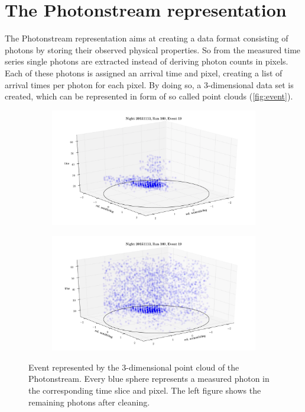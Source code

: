 \section{The Photonstream representation}

The Photonstream representation aims at creating a data format consisting of photons by storing their observed physical properties. So from the measured time series single photons are extracted instead of deriving photon counts in pixels. Each of these photons is assigned an arrival time and pixel, creating a list of arrival times per photon for each pixel. By doing so, a 3-dimensional data set is created, which can be represented in form of so called point clouds (\autoref{fig:event}).
%
\begin{figure}
  \begin{subfigure}{0.475\textwidth}
    \includegraphics[width=1.1\textwidth]{Plots/event1.png}
  \end{subfigure}
  \begin{subfigure}{0.475\textwidth}
    \includegraphics[width=1.1\textwidth]{Plots/event2.png}
  \end{subfigure}
  \caption{Event represented by the 3-dimensional point cloud of the Photonstream. Every blue sphere represents a measured photon in the corresponding time slice and pixel. The left figure shows the remaining photons after cleaning.}
  \label{fig:event}
\end{figure}
